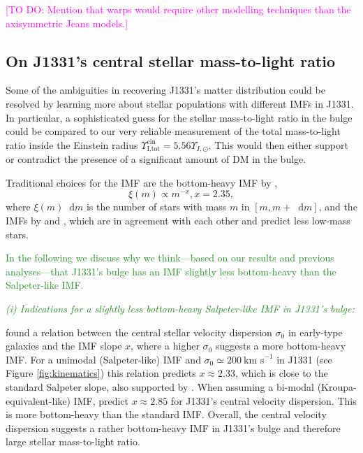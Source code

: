 \documentclass[useAMS,usenatbib]{mnras}
\newcommand*\diff{\mathop{}\!\mathrm{d}}
\newcommand{\Wilma}[1]{\textcolor{Magenta}{#1}}
\newcommand{\NEW}[1]{\textcolor{ForestGreen}{#1}}
\begin{document}
\Wilma{[TO DO: Mention that warps would require other modelling techniques than the axisymmetric Jeans models.]}

\subsection{On J1331's central stellar mass-to-light ratio} \label{sec:MLdiscussion}

Some of the ambiguities in recovering J1331's matter distribution could be resolved by learning more about stellar populations with different IMFs in J1331. In particular, a sophisticated guess for the stellar mass-to-light ratio in the bulge could be compared to our very reliable measurement of the total mass-to-light ratio inside the Einstein radius $\Upsilon_\text{I,tot}^\text{ein} = 5.56 \Upsilon_{I,\odot}$. This would then either support or contradict the presence of a significant amount of DM in the bulge.

Traditional choices for the IMF are the bottom-heavy IMF by \citet{Salpeter1955},
$$\xi(m) \propto m^{-x}, x=2.35,$$
where $\xi(m) \diff m$ is the number of stars with mass $m$ in $[m,m+\diff m]$, and the IMFs by \citet{2002Sci...295...82K} and \citet{Chabrier2003}, which are in agreement with each other and predict less low-mass stars.

\NEW{In the following we discuss why we think---based on our results and previous analyses---that J1331's bulge has an IMF slightly less bottom-heavy than the Salpeter-like IMF.}

\NEW{\emph{(i) Indications for a slightly less bottom-heavy Salpeter-like IMF in J1331's bulge:}} 

\citet{Ferreras} found a relation between the central stellar velocity dispersion $\sigma_0$ in early-type galaxies and the IMF slope $x$, where a higher $\sigma_0$ suggests a more bottom-heavy IMF. For a unimodal (Salpeter-like) IMF and $\sigma_0 \simeq 200~\text{km s}^{-1}$ in J1331 (see Figure \ref{fig:kinematics}) this relation predicts $x \approx 2.33$, which is close to the standard Salpeter slope, also supported by \citet{2014MNRAS.438.1483S}. When assuming a bi-modal (Kroupa-equivalent-like) IMF, \citet{Ferreras} predict $x \approx 2.85$ for J1331's central velocity dispersion. This is more bottom-heavy than the standard \citet{2002Sci...295...82K} IMF. Overall, the central velocity dispersion suggests a rather bottom-heavy IMF in J1331's bulge and therefore large stellar mass-to-light ratio. 
\end{document}
